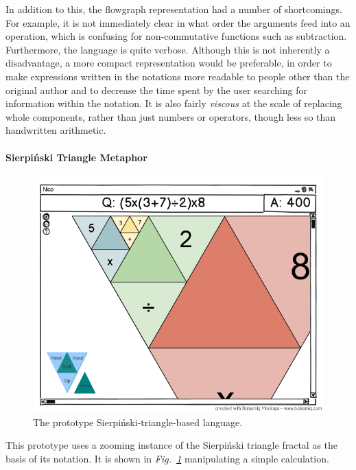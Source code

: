 \documentclass[12pt,twoside,notitlepage,xetex]{report}
\begin{document}
In addition to this, the flowgraph representation had a number of shortcomings. For example, it is not immediately clear in what order the arguments feed into an operation, which is confusing for non-commutative functions such as subtraction.  Furthermore, the language is quite verbose.  Although this is not inherently a disadvantage, a more compact representation would be preferable, in order to make expressions written in the notations more readable to people other than the original author and to decrease the time spent by the user searching for information within the notation.  It is also fairly \emph{viscous} at the scale of replacing whole components, rather than just numbers or operators, though less so than handwritten arithmetic.

\paragraph{Sierpiński Triangle Metaphor}\hfill

\begin{figure}[H]
\begin{center}
\includegraphics[width=\textwidth]{figs/mockups/sierp/sierp_mockup_full.png}
\caption{The prototype Sierpiński-triangle-based language.}
\label{fig:ProtoTri}
\end{center}
\end{figure}

This prototype uses a zooming instance of the Sierpiński triangle fractal as the basis of its notation.  It is shown in \emph{Fig.~\ref{fig:ProtoTri}} manipulating a simple calculation.
\end{document}
